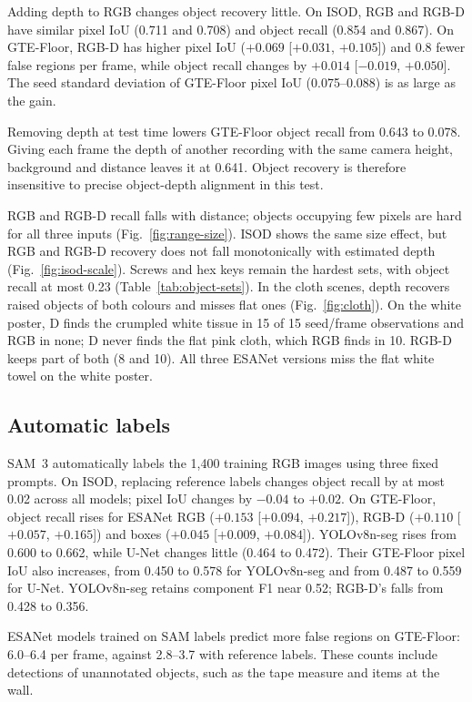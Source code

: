 Adding depth to RGB changes object recovery little. On ISOD, RGB and
RGB-D have similar pixel IoU (0.711 and 0.708) and object recall (0.854
and 0.867). On GTE-Floor, RGB-D has higher pixel IoU
($+0.069$ [$+0.031$, $+0.105$]) and 0.8 fewer false regions per frame,
while object recall changes by $+0.014$ [$-0.019$, $+0.050$]. The seed
standard deviation of GTE-Floor pixel IoU (0.075--0.088) is as large as
the gain.

Removing depth at test time lowers GTE-Floor
object recall from 0.643 to 0.078. Giving each frame the depth of another recording with the same camera height, background and distance leaves it at 0.641. Object recovery is therefore insensitive to precise object-depth alignment in this test.

RGB and RGB-D recall falls with distance; objects occupying few pixels
are hard for all three inputs
(Fig.~\ref{fig:range-size}). ISOD shows the same size effect, but RGB and
RGB-D recovery does not fall monotonically with estimated depth
(Fig.~\ref{fig:isod-scale}). Screws and hex keys remain the hardest sets,
with object recall at most 0.23 (Table~\ref{tab:object-sets}). In the cloth scenes, depth
recovers raised objects of both colours and misses flat ones
(Fig.~\ref{fig:cloth}). On the white poster, D finds the crumpled white
tissue in 15 of 15 seed/frame observations and RGB in none; D never
finds the flat pink cloth, which RGB finds in 10. RGB-D keeps part of
both (8 and 10). All three ESANet versions miss the flat white towel on the white
poster.



\subsection{Automatic labels}

SAM~3 automatically labels the 1,400 training RGB images using three
fixed prompts. On ISOD, replacing reference labels changes object recall
by at most 0.02 across all models; pixel IoU changes by $-0.04$ to $+0.02$.
On GTE-Floor, object recall rises for ESANet RGB ($+0.153$
[$+0.094$, $+0.217$]), RGB-D ($+0.110$ [$+0.057$, $+0.165$]) and boxes
($+0.045$ [$+0.009$, $+0.084$]). YOLOv8n-seg rises from 0.600 to 0.662,
while U-Net changes little (0.464 to 0.472). Their GTE-Floor pixel IoU
also increases, from 0.450 to 0.578 for YOLOv8n-seg and from 0.487 to
0.559 for U-Net. YOLOv8n-seg retains component F1 near 0.52; RGB-D's
falls from 0.428 to 0.356.

ESANet models trained on SAM labels predict more false regions on
GTE-Floor: 6.0--6.4 per frame, against 2.8--3.7 with reference labels.
These counts include detections of unannotated objects, such as the tape
measure and items at the wall.

